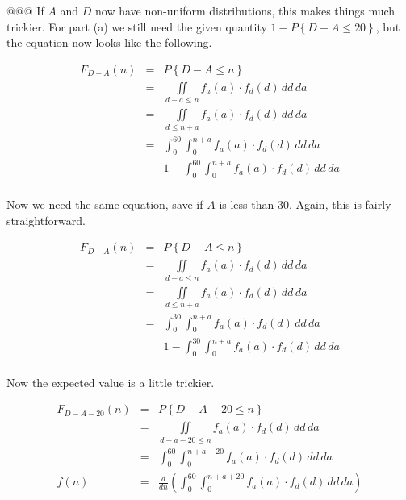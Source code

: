 \documentclass[11pt]{article}\usepackage[]{graphicx}\usepackage[]{xcolor}
\begin{document}
\begin{easylist}[enumerate]
    @@@ If $A$ and $D$ now have non-uniform distributions, this makes things much trickier. For part (a) we still need
    the given quantity $1 - P\left\{ D - A \le 20 \right\}$, but the equation now looks like the following.

    \begin{equation}
        \begin{aligned}
            F_{D - A}(n) &=& P\left\{ D - A \le n \right\}\\
                         &=& \iint\limits_{d - a \le n} f_a(a) \cdot f_d(d) \, dd \, da\\
                         &=& \iint\limits_{d \le n + a} f_a(a) \cdot f_d(d) \, dd \, da\\
                         &=& \int_0^{60} \int_0^{n+a} f_a(a) \cdot f_d(d) \, dd \, da\\
            && \boxed{1 - \int_0^{60} \int_0^{n+a} f_a(a) \cdot f_d(d) \, dd \, da}\\
        \end{aligned}
    \end{equation}

    Now we need the same equation, save if $A$ is less than 30. Again, this is fairly straightforward.

    \begin{equation}
        \begin{aligned}
            F_{D-A}(n) &=& P\left\{ D - A \le n \right\}\\
                       &=& \iint\limits_{d - a \le n} f_a(a) \cdot f_d(d) \, dd \, da\\
                       &=& \iint\limits_{d \le n + a} f_a(a) \cdot f_d(d) \, dd \, da\\
                       &=& \int_0^{30} \int_0^{n+a} f_a(a) \cdot f_d(d) \, dd \, da\\
                       && \boxed{1 - \int_0^{30} \int_0^{n+a} f_a(a) \cdot f_d(d) \, dd \, da}\\
        \end{aligned}
    \end{equation}

    Now the expected value is a little trickier.

    \begin{equation}
        \begin{aligned}
            F_{D - A - 20}(n) &=& P\left\{ D - A - 20 \le n \right\}\\
                              &=& \iint\limits_{d - a - 20 \le n} f_a(a) \cdot f_d(d) \, dd \, da\\
                              &=& \int_0^{60} \int_0^{n + a + 20} f_a(a) \cdot f_d(d) \, dd\,da\\
                         f(n) &=& \frac{d}{dn} \left( \int_0^{60} \int_0^{n + a + 20} f_a(a) \cdot f_d(d) \, dd\,da \right)\\
        \end{aligned}
    \end{equation}


\end{easylist}
\end{document}

